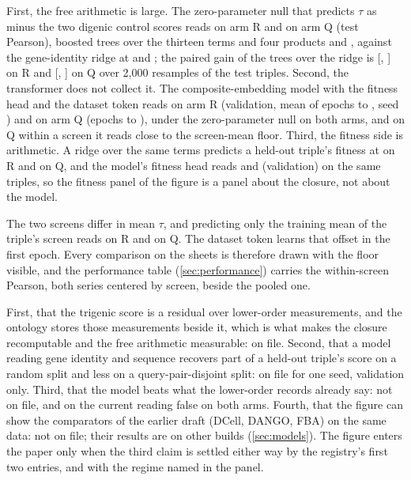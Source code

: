  First, the free arithmetic is large. The
zero-parameter null that predicts $\tau$ as minus the two digenic control scores reads
\gloRNOnemultquerydoubletest{} on arm R and \gloQNOnemultquerydoubletest{} on arm Q (test
Pearson), boosted trees over the thirteen terms and four products
\gloRLTwohgblowerordertest{} and \gloQLTwohgblowerordertest{}, against the gene-identity
ridge at \gloRBOneadditivegenetest{} and \gloQBOneadditivegenetest{}; the paired gain of
the trees over the ridge is \gpairRBOneadditivegeneLTwohgblowerorder{}
[\gpairRBOneadditivegeneLTwohgblowerorderLo{}, \gpairRBOneadditivegeneLTwohgblowerorderHi{}]
on R and \gpairQBOneadditivegeneLTwohgblowerorder{}
[\gpairQBOneadditivegeneLTwohgblowerorderLo{}, \gpairQBOneadditivegeneLTwohgblowerorderHi{}]
on Q over 2,000 resamples of the test triples. Second, the transformer does not collect
it. The composite-embedding model with the fitness head and the dataset token reads
\gcgtRValWindow{} on arm R (validation, mean of epochs \gcgtRFirstEpoch{} to
\gcgtRLastEpoch{}, seed \gcgtRSeed{}) and \gcgtQValWindow{} on arm Q (epochs
\gcgtQFirstEpoch{} to \gcgtQLastEpoch{}), under the zero-parameter null on both arms, and
on Q within a screen it reads close to the screen-mean floor. Third, the fitness side is
arithmetic. A ridge over the same terms predicts a held-out triple's fitness at
\gloRFOneridgelowerorderfitnesstest{} on R and \gloQFOneridgelowerorderfitnesstest{} on
Q, and the model's fitness head reads \gfitRCgtValWindow{} and \gfitQCgtValWindow{}
(validation) on the same triples, so the fitness panel of the figure is a panel about
the closure, not about the model.

 The two screens differ in mean $\tau$, and
predicting only the training mean of the triple's screen reads
\gloRNZeroscreenmeantest{} on R and \gloQNZeroscreenmeantest{} on Q. The dataset token
learns that offset in the first epoch. Every comparison on the sheets is therefore drawn
with the floor visible, and the performance table (\ref{sec:performance}) carries the
within-screen Pearson, both series centered by screen, beside the pooled one.

 First, that the trigenic score is a
residual over lower-order measurements, and the ontology stores those measurements beside
it, which is what makes the closure recomputable and the free arithmetic measurable: on
file. Second, that a model reading gene identity and sequence recovers part of a held-out
triple's score on a random split and less on a query-pair-disjoint split: on file for one
seed, validation only. Third, that the model beats what the lower-order records already
say: not on file, and on the current reading false on both arms. Fourth, that the figure
can show the comparators of the earlier draft (DCell, DANGO, FBA) on the same data: not on
file; their results are on other builds (\ref{sec:models}). The figure enters the paper
only when the third claim is settled either way by the registry's first two entries, and
with the regime named in the panel.
